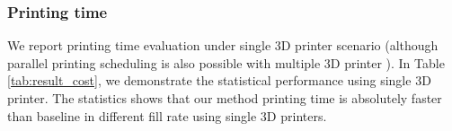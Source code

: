 \subsubsection{Printing time}
We report printing time evaluation under single 3D printer scenario (although parallel printing scheduling is also possible with multiple 3D printer
).
In Table \ref{tab:result_cost}, we demonstrate the statistical performance using single 3{D} printer. 
The statistics shows that our method printing time is absolutely faster than baseline in different fill rate using single 3D printers. 

